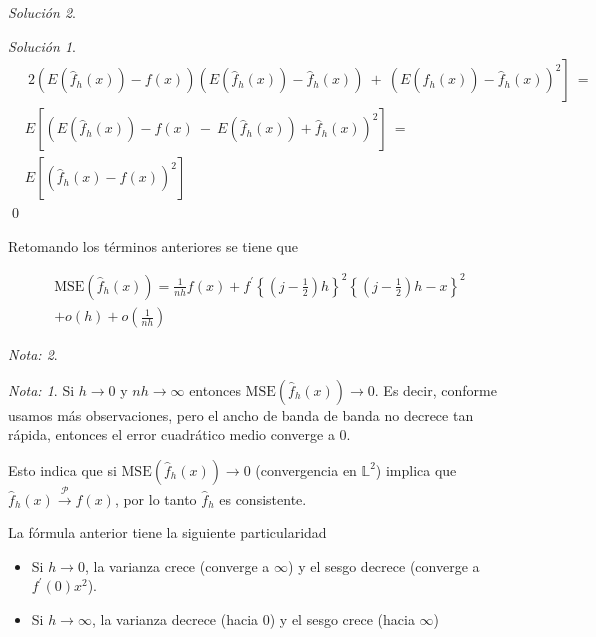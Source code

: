 \documentclass[
  12pt,
]{book}
\providecommand{\tightlist}{%
  \setlength{\itemsep}{0pt}\setlength{\parskip}{0pt}}
\theoremstyle{definition}
\theoremstyle{definition}
\theoremstyle{definition}
\theoremstyle{remark}
\newtheorem*{remark}{Nota: }
\newtheorem*{solution}{Solución}
\begin{document}
\begin{solution}
\begin{solution}
\begin{align*}
& \left. \ 2\left( E\left(\hat{f}_h(x)\right) - f(x)   \right) \left(E\left(\hat{f}_h(x)\right) - \hat{f}_h(x)    \right) \ + \ \left( E\left(\hat{f}_h(x)\right) - \hat{f}_h(x)\right)^2   \right] \ = \  \\
& E\left[ \left(E\left(\hat{f}_h(x)\right) - f(x) \ - \ E\left(\hat{f}_h(x)\right) + \hat{f}_h(x) \right)^2   \right] \ = \                                                                                \\
& E\left[\left(\hat{f}_h(x) - f(x)\right)^2    \right]
\end{align*}
\qed

\end{solution}
\end{solution}

Retomando los términos anteriores se tiene que

\begin{multline*}
\mathrm{MSE}\left( \hat{f}_h(x)\right) =
\frac{1}{nh} f(x) + f^\prime
\left\{
\left(
j - \frac{1}{2}
\right) h
\right\}^2
\left\{
\left(
j - \frac{1}{2}
\right) h - x
\right\}^2 \\
+ o\left(h \right) +        o\left(\frac{1}{nh} \right)
\end{multline*}

\begin{remark}
\begin{remark}

{}Si \(h \to 0\) y \(nh \to \infty\) entonces \(\mathrm{MSE}\left( \hat{f}_h(x)\right) \to 0\). Es decir, conforme usamos más observaciones, pero el ancho de banda de banda no decrece tan rápida, entonces el error cuadrático medio converge a 0.

Esto indica que si \(\mathrm{MSE}\left( \hat{f}_h(x)\right) \to 0\) (convergencia en \(\mathbb{L}^2\)) implica que \(\hat{f}_h(x) \stackrel{\mathcal{P}}{\to} f(x)\), por lo tanto \(\hat{f}_h\) es consistente.

\end{remark}
\end{remark}

La fórmula anterior tiene la siguiente particularidad

\begin{itemize}
\tightlist
\item
  Si \(h\to 0\), la varianza crece (converge a \(\infty\)) y el sesgo decrece (converge a \(f^\prime (0)x^2\)).
\item
  Si \(h\to \infty\), la varianza decrece (hacia 0) y el sesgo crece (hacia \(\infty\))
\end{itemize}
\end{document}
